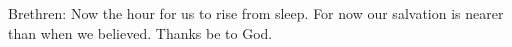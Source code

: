 Brethren: Now the hour for us to rise from sleep. For now our salvation is nearer than when we believed. \rubric{\Rbar} Thanks be to God.